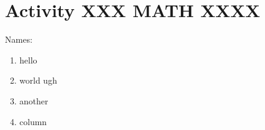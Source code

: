 \documentclass[10pt]{article}
\begin{document}
	
	\section*{Activity XXX \hfill MATH XXXX}
	
	\vspace{.25in}
	
	Names: \hrulefill
	
	\begin{multicols*}{2}
		
		\begin{enumerate}
			\item hello
			
			\vfill
			
			\item world
			\vfill 
			{\color{white} ugh} %
			
			\columnbreak
			
			\item another
			
			\vfill
			
			\item column
			
			\vfill\vfill
			
		\end{enumerate}
		
	\end{multicols*}
\end{document}
